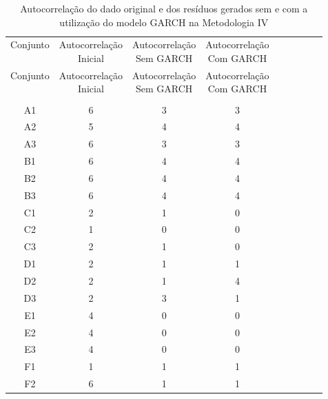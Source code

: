 \begin{center}
\begin{longtable}{ccccc|cccc}
\toprule
\rowcolor{white}
\caption[Metodologia IV: evolução da autocorrelação]{Autocorrelação do dado
original e dos resíduos gerados sem e com a utilização do modelo GARCH na
Metodologia IV} \label{tab:EvolucaoAutocorrelacaoMet4}\\
\midrule
Conjunto & \specialcell{Autocorrelação\\Inicial} & \specialcell{Autocorrelação\\Sem
GARCH} & \specialcell{Autocorrelação\\Com GARCH} \\
\midrule
\endfirsthead 
\midrule
\rowcolor{white}
Conjunto & \specialcell{Autocorrelação\\Inicial} & \specialcell{Autocorrelação\\Sem
GARCH} & \specialcell{Autocorrelação\\Com GARCH} \\
\toprule
\endhead
\midrule \\ %
\endfoot
\bottomrule 
\endlastfoot
    A1    & 6     & 3     & 3 \\
    A2    & 5     & 4     & 4 \\
    A3    & 6     & 3     & 3 \\
    B1    & 6     & 4     & 4 \\
    B2    & 6     & 4     & 4 \\
    B3    & 6     & 4     & 4 \\
    C1    & 2     & 1     & 0 \\
    C2    & 1     & 0     & 0 \\
    C3    & 2     & 1     & 0 \\
    D1    & 2     & 1     & 1 \\
    D2    & 2     & 1     & 4 \\
    D3    & 2     & 3     & 1 \\
    E1    & 4     & 0     & 0 \\
    E2    & 4     & 0     & 0 \\
    E3    & 4     & 0     & 0 \\
    F1    & 1     & 1     & 1 \\
    F2    & 6     & 1     & 1 \\

\end{longtable}
\end{center}
